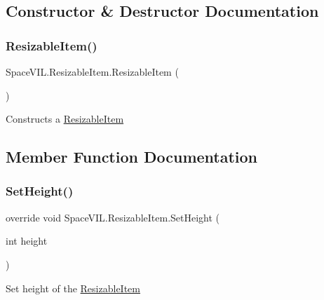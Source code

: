 \subsection{Constructor \& Destructor Documentation}
\mbox{\label{class_space_v_i_l_1_1_resizable_item_aa953ea18fb705e9cfe7da688f10530b2}} 
\subsubsection{\texorpdfstring{Resizable\+Item()}{ResizableItem()}}
{\footnotesize\ttfamily Space\+V\+I\+L.\+Resizable\+Item.\+Resizable\+Item (\begin{DoxyParamCaption}{ }\end{DoxyParamCaption})}



Constructs a \mbox{\hyperlink{class_space_v_i_l_1_1_resizable_item}{Resizable\+Item}} 



\subsection{Member Function Documentation}
\mbox{\label{class_space_v_i_l_1_1_resizable_item_a9ffdafec963a452576589d3efc452356}} 
\subsubsection{\texorpdfstring{Set\+Height()}{SetHeight()}}
{\footnotesize\ttfamily override void Space\+V\+I\+L.\+Resizable\+Item.\+Set\+Height (\begin{DoxyParamCaption}\item[{int}]{height }\end{DoxyParamCaption})\hspace{0.3cm}{\ttfamily [virtual]}}



Set height of the \mbox{\hyperlink{class_space_v_i_l_1_1_resizable_item}{Resizable\+Item}} 



